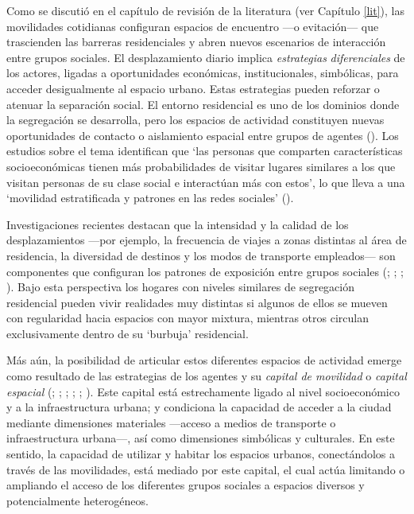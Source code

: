 \documentclass[
  spanish,
  a4paper,%
  chapterprefix=true,%
  DIV=calc,%
  twoside]{scrbook}%
\begin{document}
Como se discutió en el capítulo de revisión de la literatura (ver
Capítulo \ref{lit}), las movilidades cotidianas configuran espacios de
encuentro ---o evitación--- que trascienden las barreras residenciales y
abren nuevos escenarios de interacción entre grupos sociales. El
desplazamiento diario implica \emph{estrategias} \emph{diferenciales} de los
actores, ligadas a oportunidades económicas, institucionales,
simbólicas, para acceder desigualmente al espacio urbano. Estas
estrategias pueden reforzar o atenuar la separación social. El entorno
residencial es uno de los dominios donde la segregación se desarrolla,
pero los espacios de actividad constituyen nuevas oportunidades de
contacto o aislamiento espacial entre grupos de agentes (). Los
estudios sobre el tema identifican que `las personas que comparten
características socioeconómicas tienen más probabilidades de visitar
lugares similares a los que visitan personas de su clase social e
interactúan más con estos', lo que lleva a una `movilidad estratificada
y patrones en las redes sociales' ().

Investigaciones recientes destacan que la intensidad y la calidad de los
desplazamientos ---por ejemplo, la frecuencia de viajes a zonas distintas
al área de residencia, la diversidad de destinos y los modos de
transporte empleados--- son componentes que configuran los patrones de
exposición entre grupos sociales (; ; ; ). Bajo esta perspectiva los hogares con niveles
similares de segregación residencial pueden vivir realidades muy
distintas si algunos de ellos se mueven con regularidad hacia espacios
con mayor mixtura, mientras otros circulan exclusivamente dentro de su
`burbuja' residencial.

Más aún, la posibilidad de articular estos diferentes espacios de
actividad emerge como resultado de las estrategias de los agentes y su
\emph{capital de movilidad} o \emph{capital espacial} (; ; ; ; ; ). Este capital
está estrechamente ligado al nivel socioeconómico y a la infraestructura
urbana; y condiciona la capacidad de acceder a la ciudad mediante
dimensiones materiales ---acceso a medios de transporte o infraestructura
urbana---, así como dimensiones simbólicas y culturales. En este sentido,
la capacidad de utilizar y habitar los espacios urbanos, conectándolos a
través de las movilidades, está mediado por este capital, el cual actúa
limitando o ampliando el acceso de los diferentes grupos sociales a
espacios diversos y potencialmente heterogéneos.
\end{document}
